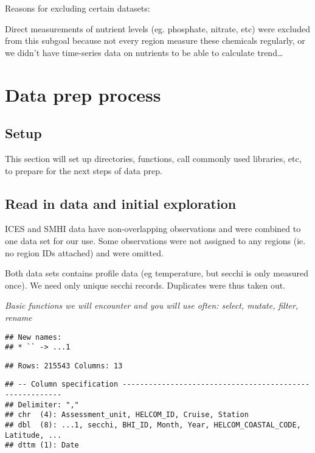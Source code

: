 \documentclass[
]{article}
\begin{document}
Reasons for excluding certain datasets:

Direct measurements of nutrient levels (eg. phosphate, nitrate, etc)
were excluded from this subgoal because not every region measure these
chemicals regularly, or we didn't have time-series data on nutrients to
be able to calculate trend\ldots{}

\hypertarget{data-prep-process}{%
\section{Data prep process}\label{data-prep-process}}

\hypertarget{setup}{%
\subsection{Setup}\label{setup}}

This section will set up directories, functions, call commonly used
libraries, etc, to prepare for the next steps of data prep.

\hypertarget{read-in-data-and-initial-exploration}{%
\subsection{Read in data and initial
exploration}\label{read-in-data-and-initial-exploration}}

ICES and SMHI data have non-overlapping observations and were combined
to one data set for our use. Some observations were not assigned to any
regions (ie. no region IDs attached) and were omitted.

Both data sets contains profile data (eg temperature, but secchi is only
measured once). We need only unique secchi records. Duplicates were thus
taken out.

\emph{Basic functions we will encounter and you will use often: select,
mutate, filter, rename}

\begin{verbatim}
## New names:
## * `` -> ...1
\end{verbatim}

\begin{verbatim}
## Rows: 215543 Columns: 13
\end{verbatim}

\begin{verbatim}
## -- Column specification --------------------------------------------------------
## Delimiter: ","
## chr  (4): Assessment_unit, HELCOM_ID, Cruise, Station
## dbl  (8): ...1, secchi, BHI_ID, Month, Year, HELCOM_COASTAL_CODE, Latitude, ...
## dttm (1): Date
\end{verbatim}
\end{document}
